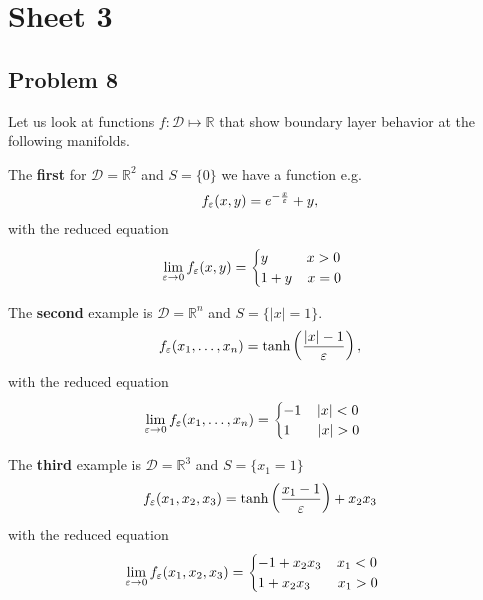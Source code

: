 


\maketitle
\tableofcontents

\section{Sheet 3}
\subsection{Problem 8}
Let us look at functions $f: \mathcal{D} \mapsto \mathbb{R}$ that show
boundary layer behavior at the following manifolds.

The \textbf{first} for $\mathcal{D} = \mathbb{R}^2$ and $S = \{0\}$ we have a
function e.g.
\begin{align}
    f_{\varepsilon}(x, y) = e^{-\frac{x}{\varepsilon}} + y,
\end{align}
with the reduced equation
\begin{align}
    \lim_{\varepsilon \rightarrow 0} f_{\varepsilon}(x, y) =
    \begin{cases}
        y \;\;\;\;\;\;\;\;\;\; x > 0\\
        1+y \;\;\;\; x = 0\\
    \end{cases}
\end{align}

The \textbf{second} example is $\mathcal{D} = \mathbb{R}^n$ and $S = \{|x| = 1\}$.
\begin{align}
    f_\varepsilon(x_1,\dots,x_n) = \tanh\left(\frac{|x| - 1}{\varepsilon} \right),
\end{align}
with the reduced equation
\begin{align}
    \lim_{\varepsilon \rightarrow 0} f_{\varepsilon}(x_1,\dots, x_n) =
    \begin{cases}
        -1 \;\;\;\; |x| < 0\\
        1  \;\;\;\;\;\;\; |x| > 0\\
    \end{cases}
\end{align}

The \textbf{third} example is $\mathcal{D} = \mathbb{R}^3$ and $S = \{x_1 =
1\}$
\begin{align}
    f_\varepsilon(x_1, x_2, x_3) = \tanh\left(\frac{x_1 - 1}{\varepsilon}\right)+x_2x_3
\end{align}
with the reduced equation
\begin{align}
    \lim_{\varepsilon \rightarrow 0} f_{\varepsilon}(x_1,x_2,x_3) =
    \begin{cases}
        -1 + x_2x_3 \;\;\;\; x_1 < 0\\
        1 + x_2x_3 \;\;\;\;\;\;\; x_1 > 0\\
    \end{cases}
\end{align}
